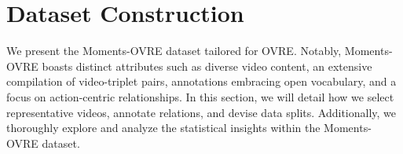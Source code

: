 \documentclass[letterpaper]{article}
\begin{document}
\section{Dataset Construction}
We present the Moments-OVRE dataset tailored for OVRE. Notably, Moments-OVRE boasts distinct attributes such as diverse video content, an extensive compilation of video-triplet pairs, annotations embracing open vocabulary, and a focus on action-centric relationships.
In this section, we will detail how we select representative videos, annotate relations, and devise data splits. Additionally, we thoroughly explore and analyze the statistical insights within the Moments-OVRE dataset.
\end{document}
